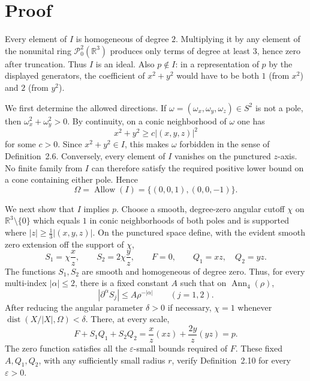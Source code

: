 \documentclass[11pt,a4paper]{article}
\newcommand{\R}{\mathbb R}
\newcommand{\Pjet}{\mathcal P^2_0(\R^3)}
\newcommand{\Allow}{\operatorname{Allow}}
\begin{document}
\section*{Proof}
Every element of $I$ is homogeneous of degree $2$.  Multiplying it by any
element of the nonunital ring $\Pjet$ produces only terms of degree at least
$3$, hence zero after truncation.  Thus $I$ is an ideal.  Also $p\notin I$:
in a representation of $p$ by the displayed generators, the coefficient of
$x^2+y^2$ would have to be both $1$ (from $x^2$) and $2$ (from $y^2$).

We first determine the allowed directions.  If
$\omega=(\omega_x,\omega_y,\omega_z)\in S^2$ is not a pole, then
$\omega_x^2+\omega_y^2>0$.  By continuity, on a conic neighborhood of
$\omega$ one has
\[
 x^2+y^2\ge c\lvert(x,y,z)\rvert^2
\]
for some $c>0$.  Since $x^2+y^2\in I$, this makes $\omega$ forbidden in the
sense of Definition~2.6.  Conversely, every element of $I$ vanishes on the
punctured $z$-axis.  No finite family from $I$ can therefore satisfy the
required positive lower bound on a cone containing either pole.  Hence
\begin{equation}\label{eq:omega}
 \Omega=\Allow(I)=\{(0,0,1),(0,0,-1)\}.
\end{equation}

We next show that $I$ implies $p$.  Choose a smooth, degree-zero angular
cutoff $\chi$ on $\R^3\setminus\{0\}$ which equals $1$ in conic
neighborhoods of both poles and is supported where
$|z|\ge \tfrac13|(x,y,z)|$.  On the punctured space define, with the evident
smooth zero extension off the support of $\chi$,
\[
 S_1=\chi\frac{x}{z},\qquad S_2=2\chi\frac{y}{z},\qquad F=0,
 \qquad Q_1=xz,\quad Q_2=yz.
\]
The functions $S_1,S_2$ are smooth and homogeneous of degree zero.  Thus,
for every multi-index $|\alpha|\le2$, there is a fixed constant $A$ such that
on $\operatorname{Ann}_4(\rho)$,
\[
 |\partial^\alpha S_j|\le A\rho^{-|\alpha|}\qquad(j=1,2).
\]
After reducing the angular parameter $\delta>0$ if necessary, $\chi=1$
whenever $\operatorname{dist}(X/|X|,\Omega)<\delta$.  There, at every scale,
\[
 F+S_1Q_1+S_2Q_2
 =\frac{x}{z}(xz)+\frac{2y}{z}(yz)=p.
\]
The zero function satisfies all the $\varepsilon$-small bounds required of
$F$.  These fixed $A,Q_1,Q_2$, with any sufficiently small radius $r$, verify
Definition~2.10 for every $\varepsilon>0$.
\end{document}
